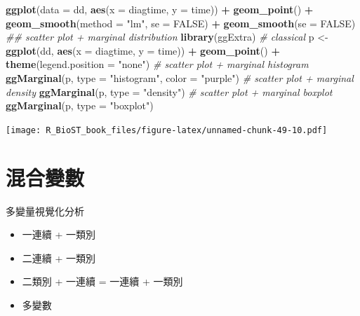 \documentclass[
]{book}
\newenvironment{Shaded}{\begin{snugshade}}{\end{snugshade}}
\newcommand{\CommentTok}[1]{\textcolor[rgb]{0.56,0.35,0.01}{\textit{#1}}}
\newcommand{\DataTypeTok}[1]{\textcolor[rgb]{0.13,0.29,0.53}{#1}}
\newcommand{\KeywordTok}[1]{\textcolor[rgb]{0.13,0.29,0.53}{\textbf{#1}}}
\newcommand{\NormalTok}[1]{#1}
\newcommand{\OperatorTok}[1]{\textcolor[rgb]{0.81,0.36,0.00}{\textbf{#1}}}
\newcommand{\OtherTok}[1]{\textcolor[rgb]{0.56,0.35,0.01}{#1}}
\newcommand{\StringTok}[1]{\textcolor[rgb]{0.31,0.60,0.02}{#1}}
\providecommand{\tightlist}{%
  \setlength{\itemsep}{0pt}\setlength{\parskip}{0pt}}
\begin{document}
\begin{Shaded}
\begin{Highlighting}[]
\KeywordTok{ggplot}\NormalTok{(}\DataTypeTok{data =}\NormalTok{ dd, }\KeywordTok{aes}\NormalTok{(}\DataTypeTok{x =}\NormalTok{ diagtime, }\DataTypeTok{y =}\NormalTok{ time)) }\OperatorTok{+}\StringTok{ }
\StringTok{  }\KeywordTok{geom\_point}\NormalTok{() }\OperatorTok{+}\StringTok{ }
\StringTok{  }\KeywordTok{geom\_smooth}\NormalTok{(}\DataTypeTok{method =} \StringTok{"lm"}\NormalTok{, }\DataTypeTok{se =} \OtherTok{FALSE}\NormalTok{) }\OperatorTok{+}\StringTok{ }
\StringTok{  }\KeywordTok{geom\_smooth}\NormalTok{(}\DataTypeTok{se =} \OtherTok{FALSE}\NormalTok{)}
\CommentTok{\#\# scatter plot + marginal distribution}
\KeywordTok{library}\NormalTok{(ggExtra)}
\CommentTok{\# classical}
\NormalTok{p \textless{}{-}}\StringTok{ }\KeywordTok{ggplot}\NormalTok{(dd, }\KeywordTok{aes}\NormalTok{(}\DataTypeTok{x =}\NormalTok{ diagtime, }\DataTypeTok{y =}\NormalTok{ time)) }\OperatorTok{+}
\StringTok{      }\KeywordTok{geom\_point}\NormalTok{() }\OperatorTok{+}
\StringTok{      }\KeywordTok{theme}\NormalTok{(}\DataTypeTok{legend.position =} \StringTok{"none"}\NormalTok{)}
\CommentTok{\# scatter plot + marginal histogram}
\KeywordTok{ggMarginal}\NormalTok{(p, }\DataTypeTok{type =} \StringTok{"histogram"}\NormalTok{, }\DataTypeTok{color =} \StringTok{"purple"}\NormalTok{)}
\CommentTok{\# scatter plot + marginal density}
\KeywordTok{ggMarginal}\NormalTok{(p, }\DataTypeTok{type =} \StringTok{"density"}\NormalTok{)}
\CommentTok{\# scatter plot + marginal boxplot}
\KeywordTok{ggMarginal}\NormalTok{(p, }\DataTypeTok{type =} \StringTok{"boxplot"}\NormalTok{)}
\end{Highlighting}
\end{Shaded}

\texttt{[image: R\_BioST\_book\_files/figure-latex/unnamed-chunk-49-10.pdf]}

\hypertarget{ux6df7ux5408ux8b8aux6578}{%
\section{混合變數}\label{ux6df7ux5408ux8b8aux6578}}

多變量視覺化分析

\begin{itemize}
\tightlist
\item
  一連續 + 一類別
\item
  二連續 + 一類別
\item
  二類別 + 一連續 = 一連續 + 一類別
\item
  多變數
\end{itemize}
\end{document}
